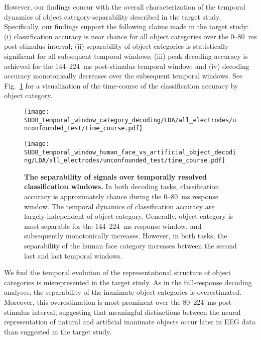 However, our findings concur with the overall characterization of the temporal dynamics of object category-separability described in the target study. Specifically, our findings support the following claims made in the target study: (i) classification accuracy is near chance for all object categories over the 0--80~ms post-stimulus interval; (ii) separability of object categories is statistically significant for all subsequent temporal windows; (iii) peak decoding accuracy is achieved for the 144--224~ms post-stimulus temporal window; and (iv) decoding accuracy monotonically decreases over the subsequent temporal windows. See Fig.~\ref{fig:category-timecourse} for a visualization of the time-course of the classification accuracy by object category.

\begin{figure}
    \centering
    \begin{minipage}{\columnwidth} 
    \texttt{[image: SUDB\_temporal\_window\_category\_decoding/LDA/all\_electrodes/unconfounded\_test/time\_course.pdf]}
    \end{minipage}
    \hfill
    \begin{minipage}{\columnwidth} 
    \texttt{[image: SUDB\_temporal\_window\_human\_face\_vs\_artificial\_object\_decoding/LDA/all\_electrodes/unconfounded\_test/time\_course.pdf]}  
    \end{minipage}
    \caption{\textbf{The separability of signals over temporally resolved classification windows.} In both decoding tasks, classification accuracy is approximately chance during the 0--80~ms response window. The temporal dynamics of classification accuracy are largely independent of object category. Generally, object category is most separable for the 144--224~ms response window, and subsequently monotonically increases. However, in both tasks, the separability of the human face category increases between the second last and last temporal windows. \label{fig:category-timecourse}}
\end{figure}

We find the temporal evolution of the representational structure of object categories is misrepresented in the target study. As in the full-response decoding analyses, the separability of the inanimate object categories is overestimated. Moreover, this overestimation is most prominent over the 80--224~ms post-stimulus interval, suggesting that meaningful distinctions between the neural representation of natural and artificial inanimate objects occur later in EEG data than suggested in the target study.

